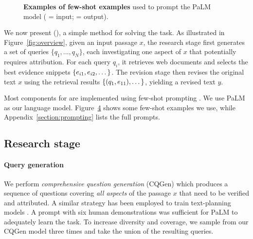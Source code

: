 \documentclass[11pt]{article}
\begin{document}
\begin{figure}[!t]
{\begin{tabular}{@{}p{}@{}}
\bottomrule
\end{tabular}
}
\begin{subfigure}{0pt}\label{fig:example_prompts_cqgen}\end{subfigure}
\begin{subfigure}{0pt}\label{fig:example_prompts_agreement}\end{subfigure}
\begin{subfigure}{0pt}\label{fig:example_prompts_revision}\end{subfigure}
\caption{
\label{fig:example_prompts}
\textbf{Examples of few-shot examples} used to prompt the PaLM model ( = input;  = output).
}
\end{figure}


We now present \approachfull{} (\approach{}), a simple method for solving the \taskName{} task.
As illustrated in Figure~\ref{fig:overview}, given an input passage $x$,
the research stage first generates a set of queries $\{q_1, ..., q_N\}$, each investigating one aspect of $x$ that potentially requires attribution.
For each query $q_i$, it retrieves web documents and selects the best evidence snippets $\{e_{i1}, e_{i2},\dots\}$.
    The revision stage then revises the original text $x$ using the retrieval results $\{(q_1, e_{11}), \dots\}$, yielding a revised text $y$.

Most components for \approach{} are implemented using few-shot prompting \cite{Brown2020LanguageMA}. We use PaLM \cite{Chowdhery2022PaLMSL} as our language model.
Figure~\ref{fig:example_prompts} shows some few-shot examples we use, while Appendix~\ref{section:prompting} lists the full prompts.





\subsection{Research stage}
\label{section:qgen}


\paragraph{Query generation}
We perform \emph{comprehensive question generation} (CQGen) which produces a sequence of questions covering \emph{all aspects} of the passage $x$ that need to be verified and attributed.
A similar strategy has been employed to train text-planning models \cite{narayan2022blueprint}.
A prompt with six human demonstrations %
was sufficient for PaLM to adequately learn the task.  To increase diversity and coverage, we sample from our CQGen model three times and take the union of the resulting queries.
\end{document}
